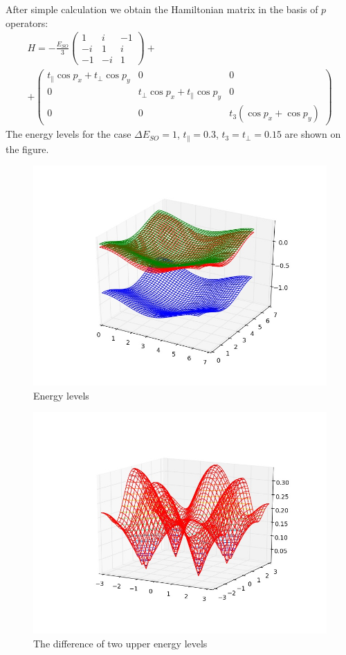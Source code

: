 \documentclass{article}
\begin{document}
After simple calculation we obtain the Hamiltonian matrix in the basis of $p$ operators:
\begin{multline}
	H = -\frac{E_{SO}}{3}
		\left(\begin{matrix}
			1 & i & -1 \\
			-i & 1 & i \\
			-1 & -i & 1
		\end{matrix} \right)
		+\\
		+\left(\begin{matrix}
			t_{\parallel} \cos{p_x} + t_{\perp} \cos{p_y} & 0 & 0 \\
			0 &  t_{\perp} \cos{p_x} + t_{\parallel} \cos{p_y} & 0 \\
			0 & 0 &  t_{3} (\cos{p_x} + \cos{p_y}) 
		\end{matrix} \right)
\end{multline}
The energy levels for the case $\Delta E_{SO} = 1$, $t_{\parallel} = 0.3$, $t_3 = t_{\perp} = 0.15$ 
are shown on the figure.
\begin{figure}[h]
	\centering
	\includegraphics[width=0.6\linewidth]{tb_model/levels.jpg}
	\caption{Energy levels}
\end{figure}
\begin{figure}[h]
	\centering
	\includegraphics[width=0.6\linewidth]{tb_model/diff_levels.jpg}
	\caption{The difference of two upper energy levels}
\end{figure}
\end{document}
